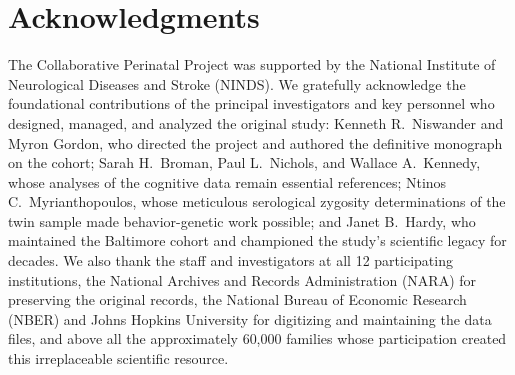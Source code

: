 \documentclass[12pt]{article}
\begin{document}
\section*{Acknowledgments}

The Collaborative Perinatal Project was supported by the National Institute of Neurological Diseases and Stroke (NINDS). We gratefully acknowledge the foundational contributions of the principal investigators and key personnel who designed, managed, and analyzed the original study: Kenneth R.\ Niswander and Myron Gordon, who directed the project and authored the definitive monograph on the cohort; Sarah H.\ Broman, Paul L.\ Nichols, and Wallace A.\ Kennedy, whose analyses of the cognitive data remain essential references; Ntinos C.\ Myrianthopoulos, whose meticulous serological zygosity determinations of the twin sample made behavior-genetic work possible; and Janet B.\ Hardy, who maintained the Baltimore cohort and championed the study's scientific legacy for decades. We also thank the staff and investigators at all 12 participating institutions, the National Archives and Records Administration (NARA) for preserving the original records, the National Bureau of Economic Research (NBER) and Johns Hopkins University for digitizing and maintaining the data files, and above all the approximately 60,000 families whose participation created this irreplaceable scientific resource.
\end{document}
